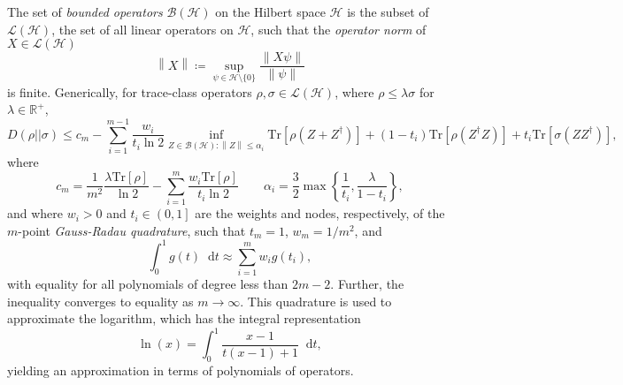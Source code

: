 \documentclass[10pt, a4paper]{article}
\numberwithin{equation}{section} %
\theoremstyle{definition}
\theoremstyle{plain}
\newcommand{\norm}[1]{\left\lVert#1\right\rVert}
\newcommand{\dif}{\mathop{}\!\mathrm{d}} %
\newcommand{\ocintv}[2]{\left(#1,#2\right]}
\newcommand{\?}{\mathrel{?}} %
\newcommand{\R}{\mathbb{R}} %
\newcommand{\Tr}{\mathrm{Tr}} %
\newcommand{\Hs}{\mathcal{H}} %
\newcommand{\sB}{\mathcal{B}}
\begin{document}
    The set of \emph{bounded operators} \(\mathcal{B}(\Hs)\) on the Hilbert space \(\Hs\) is the subset of \(\mathcal{L}(\Hs)\), the set of all linear operators on \(\Hs\), such that the \emph{operator norm} of \(X \in \mathcal{L}(\Hs)\)
      \[ \norm{X} \coloneqq \sup_{\psi \in \Hs \setminus \{0\}} \frac{\norm{X\psi}}{\norm{\psi}} \]
      is finite. Generically, for trace-class operators \(\rho, \sigma \in \mathcal{L}(\Hs)\), where \(\rho \leq \lambda\sigma\) for \(\lambda \in \R^+\),
      \begin{equation}
        D(\rho||\sigma) \leq c_m - \sum_{i=1}^{m-1} \frac{w_i}{t_i \ln 2} \inf_{Z \in \sB(\Hs) : \norm{Z} \leq \alpha_i} \Tr\left[\rho\left(Z + Z^{\dagger}\right)\right] + (1-t_i)\Tr\left[\rho\left(Z^{\dagger}Z\right)\right] + t_i\Tr\left[\sigma\left(ZZ^{\dagger}\right)\right],
      \end{equation}
      where
      \begin{equation}
        c_m = \frac{1}{m^2} \frac{\lambda \Tr[\rho]}{\ln 2} - \sum_{i=1}^m \frac{w_i \Tr[\rho]}{t_i \ln 2} \qquad \alpha_i = \frac{3}{2} \max\left\{\frac{1}{t_i}, \frac{\lambda}{1-t_i}\right\},
      \end{equation}
      and where \(w_i > 0\) and \(t_i \in \ocintv{0}{1}\) are the weights and nodes, respectively, of the \(m\)-point \emph{Gauss-Radau quadrature}, such that \(t_m = 1\), \(w_m = 1/m^2\), and
      \begin{equation}
        \int_{0}^{1} g(t) \dif{t} \approx \sum_{i=1}^m w_i g(t_i),
      \end{equation}
      with equality for all polynomials of degree less than \(2m-2\). Further, the inequality converges to equality as \(m \to \infty\). This quadrature is used to approximate the logarithm, which has the integral representation
      \begin{equation}
        \ln(x) = \int_{0}^{1} \frac{x-1}{t(x-1) + 1} \dif{t},
      \end{equation}
      yielding an approximation in terms of polynomials of operators.
\end{document}
